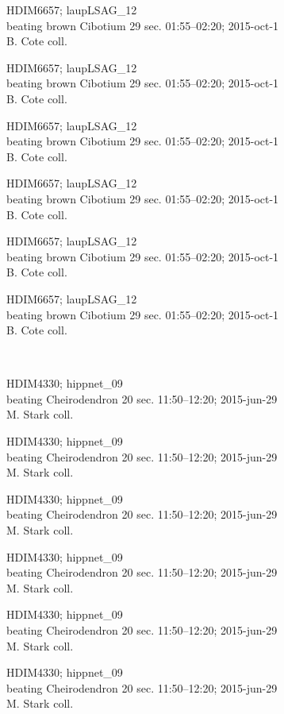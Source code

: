 \documentclass[2pt]{extarticle}
\begin{document}
\noindent
\parbox{0.16\textwidth}{\tiny \raggedright \rule[-0.3\baselineskip]{0pt}{10pt}HDIM6657; laupLSAG\_12\\ beating brown Cibotium 29 sec. 01:55--02:20; 2015-oct-1\\ B. Cote coll.}
\parbox{0.16\textwidth}{\tiny \raggedright \rule[-0.3\baselineskip]{0pt}{10pt}HDIM6657; laupLSAG\_12\\ beating brown Cibotium 29 sec. 01:55--02:20; 2015-oct-1\\ B. Cote coll.}
\parbox{0.16\textwidth}{\tiny \raggedright \rule[-0.3\baselineskip]{0pt}{10pt}HDIM6657; laupLSAG\_12\\ beating brown Cibotium 29 sec. 01:55--02:20; 2015-oct-1\\ B. Cote coll.}
\parbox{0.16\textwidth}{\tiny \raggedright \rule[-0.3\baselineskip]{0pt}{10pt}HDIM6657; laupLSAG\_12\\ beating brown Cibotium 29 sec. 01:55--02:20; 2015-oct-1\\ B. Cote coll.}
\parbox{0.16\textwidth}{\tiny \raggedright \rule[-0.3\baselineskip]{0pt}{10pt}HDIM6657; laupLSAG\_12\\ beating brown Cibotium 29 sec. 01:55--02:20; 2015-oct-1\\ B. Cote coll.}
\parbox{0.16\textwidth}{\tiny \raggedright \rule[-0.3\baselineskip]{0pt}{10pt}HDIM6657; laupLSAG\_12\\ beating brown Cibotium 29 sec. 01:55--02:20; 2015-oct-1\\ B. Cote coll.} \\ 
\vspace{0.001in} 

\noindent
\parbox{0.16\textwidth}{\tiny \raggedright \rule[-0.3\baselineskip]{0pt}{10pt}HDIM4330; hippnet\_09\\ beating Cheirodendron 20 sec. 11:50--12:20; 2015-jun-29\\ M. Stark coll.}
\parbox{0.16\textwidth}{\tiny \raggedright \rule[-0.3\baselineskip]{0pt}{10pt}HDIM4330; hippnet\_09\\ beating Cheirodendron 20 sec. 11:50--12:20; 2015-jun-29\\ M. Stark coll.}
\parbox{0.16\textwidth}{\tiny \raggedright \rule[-0.3\baselineskip]{0pt}{10pt}HDIM4330; hippnet\_09\\ beating Cheirodendron 20 sec. 11:50--12:20; 2015-jun-29\\ M. Stark coll.}
\parbox{0.16\textwidth}{\tiny \raggedright \rule[-0.3\baselineskip]{0pt}{10pt}HDIM4330; hippnet\_09\\ beating Cheirodendron 20 sec. 11:50--12:20; 2015-jun-29\\ M. Stark coll.}
\parbox{0.16\textwidth}{\tiny \raggedright \rule[-0.3\baselineskip]{0pt}{10pt}HDIM4330; hippnet\_09\\ beating Cheirodendron 20 sec. 11:50--12:20; 2015-jun-29\\ M. Stark coll.}
\parbox{0.16\textwidth}{\tiny \raggedright \rule[-0.3\baselineskip]{0pt}{10pt}HDIM4330; hippnet\_09\\ beating Cheirodendron 20 sec. 11:50--12:20; 2015-jun-29\\ M. Stark coll.} \\ 
\vspace{0.001in} 
\end{document}
